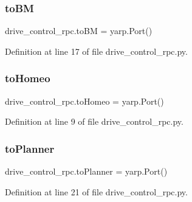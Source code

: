\subsubsection{\texorpdfstring{to\+BM}{toBM}}
{\footnotesize\ttfamily drive\+\_\+control\+\_\+rpc.\+to\+BM = yarp.\+Port()}



Definition at line 17 of file drive\+\_\+control\+\_\+rpc.\+py.

\mbox{\label{namespacedrive__control__rpc_ae6ad8a5770f962e3e8aea3973fd88b00}} 
\subsubsection{\texorpdfstring{to\+Homeo}{toHomeo}}
{\footnotesize\ttfamily drive\+\_\+control\+\_\+rpc.\+to\+Homeo = yarp.\+Port()}



Definition at line 9 of file drive\+\_\+control\+\_\+rpc.\+py.

\mbox{\label{namespacedrive__control__rpc_a4b139dc4cf2516862cb2860fc6fdc7b7}} 
\subsubsection{\texorpdfstring{to\+Planner}{toPlanner}}
{\footnotesize\ttfamily drive\+\_\+control\+\_\+rpc.\+to\+Planner = yarp.\+Port()}



Definition at line 21 of file drive\+\_\+control\+\_\+rpc.\+py.

